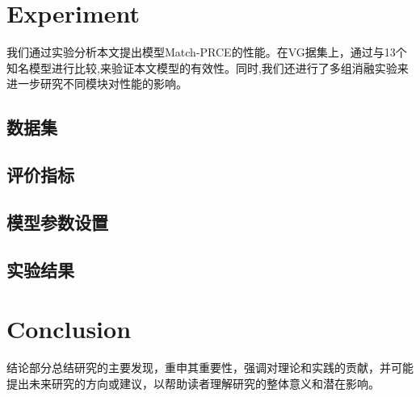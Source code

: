\documentclass{article}
\begin{document}
\section{Experiment}
\label{section:4}
我们通过实验分析本文提出模型Match-PRCE的性能。在VG据集上，通过与13个知名模型进行比较,来验证本文模型的有效性。同时,我们还进行了多组消融实验来进一步研究不同模块对性能的影响。
\subsection{数据集}
\subsection{评价指标}
\subsection{模型参数设置}
\subsection{实验结果}



\section{Conclusion}
\label{section:5}
结论部分总结研究的主要发现，重申其重要性，强调对理论和实践的贡献，并可能提出未来研究的方向或建议，以帮助读者理解研究的整体意义和潜在影响。

  
  
\end{document}

